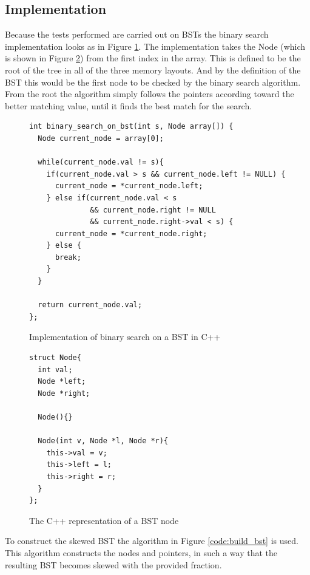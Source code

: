 \documentclass{article}
\begin{document}
\subsection{Implementation}
Because the tests performed are carried out on BSTs the binary search implementation looks as in Figure \ref{code:binary_search_bst}. The implementation takes the Node (which is shown in Figure \ref{code:node}) from the first index in the array. This is defined to be the root of the tree in all of the three memory layouts. And by the definition of the BST this would be the first node to be checked by the binary search algorithm. From the root the algorithm simply follows the pointers according toward the better matching value, until it finds the best match for the search.

\begin{figure}[H]
  \centering
  \begin{lstlisting}
int binary_search_on_bst(int s, Node array[]) {
  Node current_node = array[0];

  while(current_node.val != s){
    if(current_node.val > s && current_node.left != NULL) {
      current_node = *current_node.left;
    } else if(current_node.val < s 
    		  && current_node.right != NULL 
  		      && current_node.right->val < s) {
      current_node = *current_node.right;
    } else {
      break;
    }
  }

  return current_node.val;
};
  \end{lstlisting}
  \caption{Implementation of binary search on a BST in C++}
  \label{code:binary_search_bst}
\end{figure}

\begin{figure}[H]
	\centering
	\begin{lstlisting}
struct Node{
  int val;
  Node *left;
  Node *right;

  Node(){}
  
  Node(int v, Node *l, Node *r){
    this->val = v;
    this->left = l;
    this->right = r;
  }
};
	\end{lstlisting}
	\caption{The C++ representation of a BST node}
	\label{code:node}
\end{figure}

To construct the skewed BST the algorithm in Figure \ref{code:build_bst} is used. This algorithm constructs the nodes and pointers, in such a way that the resulting BST becomes skewed with the provided fraction.
\end{document}
